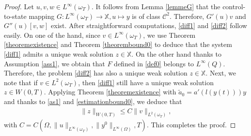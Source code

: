 \documentclass[reqno,twoside]{amsart}
\numberwithin{equation}{section}
\theoremstyle{definition}
\numberwithin{equation}{section}
\def \dis {\displaystyle}
\def \dq {\mathrm{d}x \, \mathrm{d}t}
\def \d {\mathrm{d}}
\begin{document}
\begin{proof}
Let $u,v,w\in L^\infty(\omega_T)$. It follows from Lemma \ref{lemmeG} that the control-to-state mapping $G:L^\infty(\omega_T)\to\mathbb{ X}, u\mapsto y$ is of class $\mathcal{C}^{2}$. Therefore, $G'(u)v$ and $G''(u)[v,w]$ exist. After straightforward computations, \eqref{diff1} and \eqref{diff2} follow easily. On one of the hand, since $v\in L^\infty(\omega_T)$, we use  Theorem \ref{theoremexistence} and Theorem \ref{theorembound0} to deduce that the system \eqref{diff1} admits a unique weak solution $z\in \mathbb{X}$. On the other hand thanks to Assumption \ref{ass1}, we obtain that $F$ defined in \eqref{def0} belongs to $L^\infty(Q)$. Therefore, the problem \eqref{diff2} has also a unique weak solution $z\in \mathbb{X}.$ Next, we note that if $v\in L^2(\omega_T)$, then \eqref{diff1} still have a unique weak solution $z\in W(0,T)$. Applying Theorem \ref{theoremexistence} with $\tilde{a}_0=a'(l(y(t)))y$ and thanks to \eqref{as1} and \eqref{estimationbound0}, we deduce that 
\begin{equation}\label{04}
	\begin{array}{rllll}
		\dis  \|z\|_{W(0,T)}\leq C\|v\|_{L^2(\omega_T)},
	\end{array}
\end{equation}	
with $C=C(\Omega,\|u\|_{L^\infty(\omega_T)},\|y^0\|_{L^\infty(\Omega)},T)$. This completes the proof.
%	
%	
%	

\end{proof}
\end{document}
